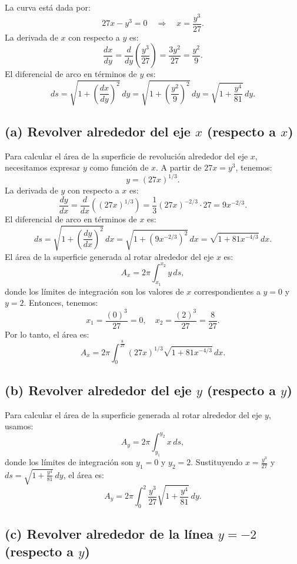 \documentclass[11pt,letterpaper]{article}
\begin{document}
La curva está dada por:
\[
27x - y^3 = 0 \quad \Rightarrow \quad x = \frac{y^3}{27}.
\]
La derivada de \(x\) con respecto a \(y\) es:
\[
\frac{dx}{dy} = \frac{d}{dy}\left(\frac{y^3}{27}\right) = \frac{3y^2}{27} = \frac{y^2}{9}.
\]
El diferencial de arco en términos de \(y\) es:
\[
ds = \sqrt{1 + \left(\frac{dx}{dy}\right)^2} \, dy = \sqrt{1 + \left(\frac{y^2}{9}\right)^2} \, dy = \sqrt{1 + \frac{y^4}{81}} \, dy.
\]

\subsection*{(a) Revolver alrededor del eje \(x\) (respecto a \(x\))}

Para calcular el área de la superficie de revolución alrededor del eje \(x\), necesitamos expresar \(y\) como función de \(x\). A partir de \( 27x = y^3 \), tenemos:
\[
y = (27x)^{1/3}.
\]
La derivada de \(y\) con respecto a \(x\) es:
\[
\frac{dy}{dx} = \frac{d}{dx} ((27x)^{1/3}) = \frac{1}{3} (27x)^{-2/3} \cdot 27 = 9x^{-2/3}.
\]
El diferencial de arco en términos de \(x\) es:
\[
ds = \sqrt{1 + \left(\frac{dy}{dx}\right)^2} \, dx = \sqrt{1 + (9x^{-2/3})^2} \, dx = \sqrt{1 + 81x^{-4/3}} \, dx.
\]
El área de la superficie generada al rotar alrededor del eje \(x\) es:
\[
A_x = 2\pi \int_{x_1}^{x_2} y \, ds,
\]
donde los límites de integración son los valores de \(x\) correspondientes a \(y = 0\) y \(y = 2\). Entonces, tenemos:
\[
x_1 = \frac{(0)^3}{27} = 0, \quad x_2 = \frac{(2)^3}{27} = \frac{8}{27}.
\]
Por lo tanto, el área es:
\[
A_x = 2\pi \int_{0}^{\frac{8}{27}} (27x)^{1/3} \sqrt{1 + 81x^{-4/3}} \, dx.
\]

\subsection*{(b) Revolver alrededor del eje \(y\) (respecto a \(y\))}

Para calcular el área de la superficie generada al rotar alrededor del eje \(y\), usamos:
\[
A_y = 2\pi \int_{y_1}^{y_2} x \, ds,
\]
donde los límites de integración son \(y_1 = 0\) y \(y_2 = 2\). Sustituyendo \(x = \frac{y^3}{27}\) y \(ds = \sqrt{1 + \frac{y^4}{81}} \, dy\), el área es:
\[
A_y = 2\pi \int_{0}^{2} \frac{y^3}{27} \sqrt{1 + \frac{y^4}{81}} \, dy.
\]


\subsection*{(c) Revolver alrededor de la línea \(y = -2\) (respecto a \(y\))}
\end{document}
